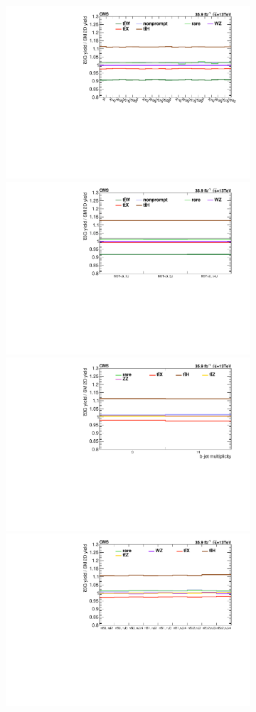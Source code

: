 \begin{figure}
  \begin{subfigure}{\linewidth}
    \centering
      \includegraphics[width=0.5\linewidth]{figures/thirteen-TeV/postfit/ratio_2l_c3G}%
      \includegraphics[width=0.5\linewidth]{figures/thirteen-TeV/postfit/ratio_2l-cr_c3G}
      \includegraphics[width=0.5\linewidth]{figures/thirteen-TeV/postfit/ratio_4l_c3G}%
      \includegraphics[width=0.5\linewidth]{figures/thirteen-TeV/postfit/ratio_3l_c3G}
    \caption{}
    \label{sfig:ratio-c3G}
  \end{subfigure}
  \begin{subfigure}{\linewidth}
    \centering

\end{subfigure}
\end{figure}
